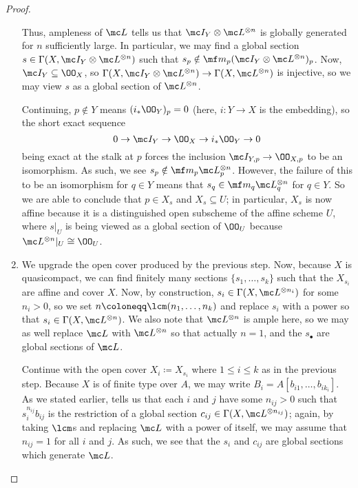 \documentclass[../notes.tex]{subfiles}
\begin{document}
\begin{proof}
\begin{enumerate}
		Thus, ampleness of $\mc L$ tells us that $\mc I_Y\otimes\mc L^{\otimes n}$ is globally generated for $n$ sufficiently large. In particular, we may find a global section $s\in\Gamma(X,\mc I_Y\otimes\mc L^{\otimes n})$ such that $s_p\notin\mf m_p(\mc I_Y\otimes\mc L^{\otimes n})_p$. Now, $\mc I_Y\subseteq\OO_X$, so $\Gamma(X,\mc I_Y\otimes\mc L^{\otimes n})\to\Gamma(X,\mc L^{\otimes n})$ is injective, so we may view $s$ as a global section of $\mc L^{\otimes n}$.

		Continuing, $p\notin Y$ means $(i_*\OO_Y)_p=0$ (here, $i\colon Y\to X$ is the embedding), so the short exact sequence
		\[0\to\mc I_Y\to\OO_X\to i_*\OO_Y\to0\]
		being exact at the stalk at $p$ forces the inclusion $\mc I_{Y,p}\to\OO_{X,p}$ to be an isomorphism. As such, we see $s_p\notin\mf m_p\mc L^{\otimes n}_p$. However, the failure of this to be an isomorphism for $q\in Y$ means that $s_q\in\mf m_q\mc L^{\otimes n}_q$ for $q\in Y$. So we are able to conclude that $p\in X_s$ and $X_s\subseteq U$; in particular, $X_s$ is now affine because it is a distinguished open subscheme of the affine scheme $U$, where $s|_U$ is being viewed as a global section of $\OO_U$ because $\mc L^{\otimes n}|_U\cong\OO_U$.

		\item We upgrade the open cover produced by the previous step. Now, because $X$ is quasicompact, we can find finitely many sections $\{s_1,\ldots,s_k\}$ such that the $X_{s_i}$ are affine and cover $X$. Now, by construction, $s_i\in\Gamma(X,\mc L^{\otimes n_i})$ for some $n_i>0$, so we set $n\coloneqq\lcm(n_1,\ldots,n_k)$ and replace $s_i$ with a power so that $s_i\in\Gamma(X,\mc L^{\otimes n})$. We also note that $\mc L^{\otimes n}$ is ample here, so we may as well replace $\mc L$ with $\mc L^{\otimes n}$ so that actually $n=1$, and the $s_\bullet$ are global sections of $\mc L$.

		Continue with the open cover $X_i\coloneqq X_{s_i}$ where $1\le i\le k$ as in the previous step. Because $X$ is of finite type over $A$, we may write $B_i=A[b_{i1},\ldots,b_{ik_i}]$. As we stated earlier, \cite[Lemma~II.5.14]{hartshorne} tells us that each $i$ and $j$ have some $n_{ij}>0$ such that $s_i^{n_{ij}}b_{ij}$ is the restriction of a global section $c_{ij}\in\Gamma(X,\mc L^{\otimes n_{ij}})$; again, by taking $\lcm$s and replacing $\mc L$ with a power of itself, we may assume that $n_{ij}=1$ for all $i$ and $j$. As such, we see that the $s_i$ and $c_{ij}$ are global sections which generate $\mc L$.


\end{enumerate}
\end{proof}
\end{document}
